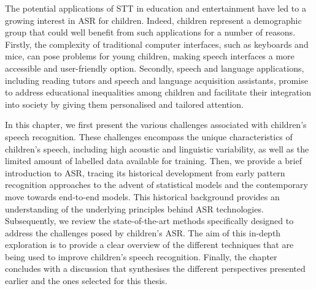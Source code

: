 The potential applications of \ac{STT} in education and entertainment have led to a growing interest in \ac{ASR} for children. Indeed, children represent a demographic group that could well benefit from such applications for a number of reasons. Firstly, the complexity of traditional computer interfaces, such as keyboards and mice, can pose problems for young children, making speech interfaces a more accessible and user-friendly option. Secondly, speech and language applications, including reading tutors and speech and language acquisition assistants, promise to address educational inequalities among children and facilitate their integration into society by giving them personalised and tailored attention.

In this chapter, we first present the various challenges associated with children's speech recognition. These challenges encompass the unique characteristics of children's speech, including high acoustic and linguistic variability, as well as the limited amount of labelled data available for training. Then, we provide a brief introduction to \ac{ASR}, tracing its historical development from early pattern recognition approaches to the advent of statistical models and the contemporary move towards end-to-end models. This historical background provides an understanding of the underlying principles behind \ac{ASR} technologies. Subsequently, we review the state-of-the-art methods specifically designed to address the challenges posed by children's \ac{ASR}.  The aim of this in-depth exploration is to provide a clear overview of the different techniques that are being used to improve children's speech recognition. Finally, the chapter concludes with a discussion that synthesises the different perspectives presented earlier and the ones selected for this thesis.

